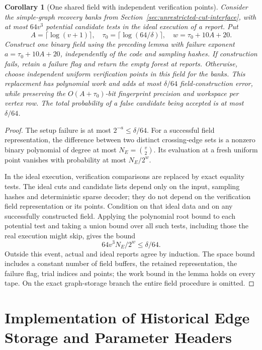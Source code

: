 \documentclass[11pt,letterpaper]{article}
\newtheorem{corollary}[theorem]{Corollary}
\numberwithin{equation}{section}
\begin{document}
\begin{corollary}[One shared field with independent verification points]
\label{cor:bounded-binary-cut-verification}
Consider the simple-graph recovery banks from Section~\ref{sec:unrestricted-cut-interface}, with at most $64v^3$ potential candidate tests in the ideal execution of a report.
Put
\[
 A=\lceil\log(v+1)\rceil,\quad
 \tau_0=\lceil\log(64/\delta)\rceil,\quad
 w=\tau_0+10A+20.
\]
Construct one binary field using the preceding lemma with failure exponent $a=\tau_0+10A+20$, independently of the code and sampling hashes.
If construction fails, retain a failure flag and return the empty forest at reports.
Otherwise, choose independent uniform verification points in this field for the banks.
This replacement has polynomial work and adds at most $\delta/64$ field-construction error, while preserving the $O(A+\tau_0)$-bit fingerprint precision and workspace per vertex row.
The total probability of a false candidate being accepted is at most $\delta/64$.
\end{corollary}
\begin{proof}
The setup failure is at most $2^{-a}\le\delta/64$.
For a successful field representation, the difference between two distinct crossing-edge sets is a nonzero binary polynomial of degree at most $N_E=\binom{v}{2}$.
Its evaluation at a fresh uniform point vanishes with probability at most $N_E/2^w$.

In the ideal execution, verification comparisons are replaced by exact equality tests.
The ideal cuts and candidate lists depend only on the input, sampling hashes and deterministic sparse decoder; they do not depend on the verification field representation or its points.
Condition on that ideal data and on any successfully constructed field.
Applying the polynomial root bound to each potential test and taking a union bound over all such tests, including those the real execution might skip, gives the bound
\[
 64v^3N_E/2^w\le\delta/64.
\]
Outside this event, actual and ideal reports agree by induction.
The space bound includes a constant number of field buffers, the retained representation, the failure flag, trial indices and points; the work bound in the lemma holds on every tape.
On the exact graph-storage branch the entire field procedure is omitted.
\end{proof}





\section{Implementation of Historical Edge Storage and Parameter Headers}
\label{app:supplementary-implementations}
\end{document}
